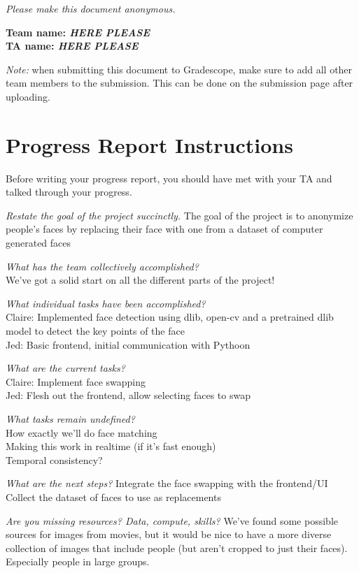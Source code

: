 \emph{Please make this document anonymous.}

\textbf{Team name: \emph{HERE PLEASE}}\\
\textbf{TA name: \emph{HERE PLEASE}}

\emph{Note:} when submitting this document to Gradescope, make sure to add all other team members to the submission. This can be done on the submission page after uploading.

\section*{Progress Report Instructions}

Before writing your progress report, you should have met with your TA and talked through your progress.

%
\textit{Restate the goal of the project succinctly.}
The goal of the project is to anonymize people's faces by replacing their face with one from a dataset of computer generated faces

\textit{What has the team collectively accomplished?}\\
We've got a solid start on all the different parts of the project!

\textit{What individual tasks have been accomplished?}\\
Claire: Implemented face detection using dlib, open-cv and a pretrained dlib model to detect the key points of the face\\
Jed: Basic frontend, initial communication with Pythoon

\textit{What are the current tasks?}\\
Claire: Implement face swapping\\
Jed: Flesh out the frontend, allow selecting faces to swap

\textit{What tasks remain undefined?}\\
How exactly we'll do face matching\\
Making this work in realtime (if it's fast enough)\\
Temporal consistency?

\textit{What are the next steps?}
Integrate the face swapping with the frontend/UI\\
Collect the dataset of faces to use as replacements

%
\textit{Are you missing resources? Data, compute, skills?}
We've found some possible sources for images from movies, but it would be nice to have a more diverse collection of images that include people (but aren't cropped to just their faces). Especially people in large groups.


